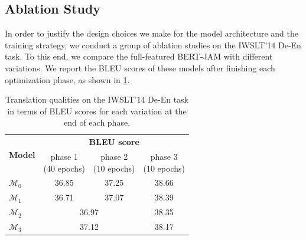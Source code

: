 \documentclass[review]{elsarticle}
\begin{document}
\subsection{Ablation Study}
\label{ssec:ablation}

In order to justify the design choices we make for the model architecture and the training strategy, we conduct a group of ablation studies on the IWSLT'14 De-En task. To this end, we compare the full-featured BERT-JAM with different variations. We report the BLEU scores of these models after finishing each optimization phase, as shown in \cref{tab:ablation}.

\begin{table}[ht]
    \caption{Translation qualities on the IWSLT'14 De-En task in terms of BLEU scores for each variation at the end of each phase.}
    \label{tab:ablation}
    \centering
    \begin{tabular}{l|c|c|c}
        \toprule
        \multirow{2}[5]{*}{\textbf{Model}}  &   \multicolumn{3}{c}{\textbf{BLEU score}} \\
        \cline{2-4} & \makecell{phase 1 \\(40 epochs)} & \makecell{phase 2 \\ (10 epochs)} & \makecell{phase 3 \\ (10 epochs)} \\
        \midrule
        $\mathcal{M}_0$ & 36.85 & 37.25 & 38.66 \\
        $\mathcal{M}_1$ & 36.71 & 37.07 & 38.39 \\
        $\mathcal{M}_2$ & \multicolumn{2}{c|}{36.97} &  38.35 \\
        $\mathcal{M}_3$ & \multicolumn{2}{c|}{37.12} & 38.17 \\
        \bottomrule
    \end{tabular}
\end{table}
\end{document}
